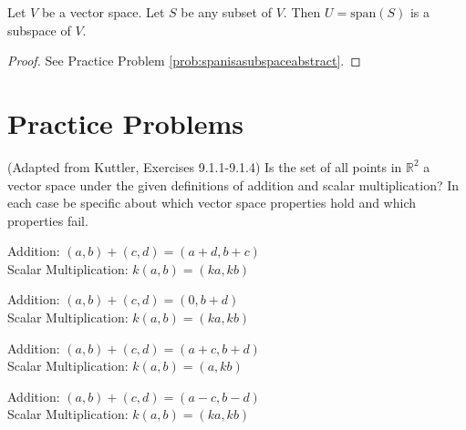 \documentclass{ximera}
\begin{document}
\begin{theorem}\label{th:spanisasubspaceabstract}
Let $V$ be a vector space.  Let $S$ be any subset of $V$.  Then $U=\mbox{span}(S)$ is a subspace of $V$.
\end{theorem}
\begin{proof}
See Practice Problem \ref{prob:spanisasubspaceabstract}.
\end{proof}

\section*{Practice Problems}
\begin{problem}
(Adapted from Kuttler, Exercises 9.1.1-9.1.4) Is the set of all points in $\mathbb{R}^2$ a vector space under the given definitions of addition and scalar multiplication?    In each case be specific about which vector space properties hold and which properties fail.
  \begin{problem}
  Addition: $(a, b)+(c, d)=(a+d, b+c)$\\ Scalar Multiplication: $k(a, b)=(ka, kb)$
  \end{problem}
  \begin{problem}
  Addition: $(a, b)+(c, d)=(0, b+d)$\\ Scalar Multiplication: $k(a, b)=(ka, kb)$
  \end{problem}
  \begin{problem}
  Addition: $(a, b)+(c, d)=(a+c, b+d)$\\ Scalar Multiplication: $k(a, b)=(a, kb)$
  \end{problem}
  \begin{problem}
  Addition: $(a, b)+(c, d)=(a-c, b-d)$\\ Scalar Multiplication: $k(a, b)=(ka, kb)$
  \end{problem}
  \end{problem}
   
\end{document}
